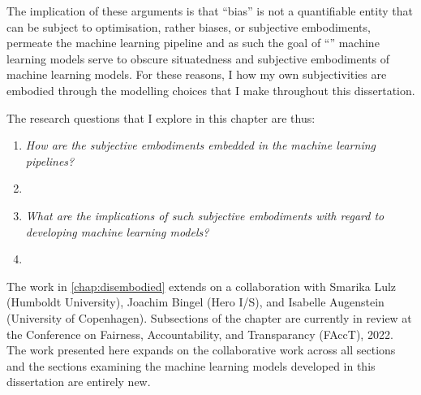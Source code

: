 The implication of these arguments is that ``bias'' is not a quantifiable entity that can be subject to optimisation, rather biases, or subjective embodiments, permeate the machine learning pipeline and as such the goal  of ``'' machine learning models serve to obscure  situatedness and subjective embodiments of machine learning models.
For these reasons, I  how my own subjectivities are embodied through the modelling choices that I make throughout this dissertation.

The research questions that I explore in this chapter are thus:

\begin{center}
\begin{minipage}{0.9\textwidth}
\vspace{5mm}
    \begin{enumerate}[start=4, label={\textbf{RQ \arabic*}}]
        \item{\textit{How are the subjective embodiments embedded in the machine learning pipelines?}}
        \item{\textit{}}
        \item{\textit{What are the implications of such subjective embodiments with regard to developing machine learning models?}}
        \item{\textit{}}
    \end{enumerate}
\vspace{5mm}
\end{minipage}
\end{center}

The work in \cref{chap:disembodied} extends on a collaboration with Smarika Lulz (Humboldt University), Joachim Bingel (Hero I/S), and Isabelle Augenstein (University of Copenhagen). Subsections of the chapter are currently in review at the Conference on Fairness, Accountability, and Transparancy (FAccT), 2022.
The work presented here expands on the collaborative work across all sections and the sections examining the machine learning models developed in this dissertation are entirely new.


